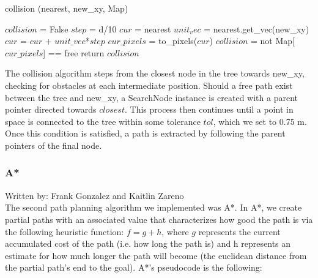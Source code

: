 \documentclass{article}
\begin{document}
\begin{algorithm}
\caption{collision (nearest, new\_xy, Map)}\label{alg:cap}
\begin{algorithmic}[1]
\State $collision$ = False
\State $step$ = d/10
\State $cur$ = nearest
\State $unit_vec$ = nearest.get\_vec(new\_xy)
    \State $cur$ = $cur$ + $unit\_vec$*$step$
    \State $cur\_pixels$ = to\_pixels($cur$)
    \State $collision$ = not Map[$cur\_pixels$] == free
\EndWhile
\State return $collision$
\end{algorithmic}
\end{algorithm}

The collision algorithm steps from the closest node in the tree towards new\_xy, checking for obstacles at each intermediate position. Should a free path exist between the tree and new\_xy, a SearchNode instance is created with a parent pointer directed towards $closest$. This process then continues until a point in space is connected to the tree within some tolerance $tol$, which we set to 0.75 {m}. Once this condition is satisfied, a path is extracted by following the parent pointers of the final node.\\

\subsubsection{A*}
Written by: Frank Gonzalez and Kaitlin Zareno\\

The second path planning algorithm we implemented was A*. In A*, we create partial paths with an associated value that characterizes how good the path is via the following heuristic function: $f = g + h$, where $g$ represents the current accumulated cost of the path (i.e. how long the path is) and h represents an estimate for how much longer the path will become (the euclidean distance from the partial path's end to the goal). A*'s pseudocode is the following:
\end{document}
